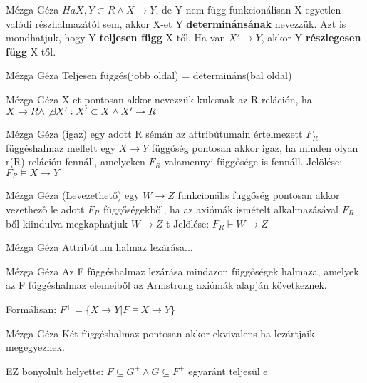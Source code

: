 \begin{definicio}{Mézga Géza}
$Ha X,Y \subset R \land X\rightarrow Y$, de Y nem függ funkcionálisan X egyetlen valódi részhalmazától sem, akkor X-et Y \textbf{determinánsának} nevezzük. Azt is mondhatjuk, hogy Y \textbf{teljesen függ} X-től. Ha van $X'\rightarrow Y$, akkor Y \textbf{részlegesen függ} X-től.
\end{definicio}

\begin{definicio}{Mézga Géza}
Teljesen függés(jobb oldal) = determináns(bal oldal)
\end{definicio}

\begin{definicio}{Mézga Géza}
X-et pontosan akkor nevezzük kulcsnak az R reláción, ha $X \rightarrow R \land \not\exists X' : X' \subset X \land X' \rightarrow R$
\end{definicio}

\begin{definicio}{Mézga Géza}
(igaz) egy adott R sémán az attribútumain értelmezett $F_R$ függéshalmaz mellett egy $X \rightarrow Y$ függőség pontosan akkor igaz, ha minden olyan r(R) reláción fennáll, amelyeken $F_R$ valamennyi függősége is fennáll. Jelölése: $F_R\models X \rightarrow Y$
\end{definicio}

\begin{definicio}{Mézga Géza}
(Levezethető) egy $W \rightarrow Z$ funkcionális függőség pontosan akkor vezethező le adott $F_R$ függőségekből, ha az axiómák ismételt alkalmazásával $F_R$ ből kiindulva megkaphatjuk $W \rightarrow Z$-t Jelölése: $F_R\vdash W\rightarrow Z$
\end{definicio}

\begin{definicio}{Mézga Géza}
Attribútum halmaz lezárása...
\end{definicio}

\begin{definicio}{Mézga Géza}
Az F függéshalmaz lezárása mindazon függőségek halmaza, amelyek az F függéshalmaz elemeiből az Armstrong axiómák alapján következnek.

Formálisan: $F^+ = \lbrace X\rightarrow Y | F \models X \rightarrow Y\rbrace$
\end{definicio}

\begin{definicio}{Mézga Géza}
Két függéshalmaz pontosan akkor ekvivalens ha lezártjaik megegyeznek.

EZ bonyolult helyette: $F \subseteq G^+ \land G \subseteq F^+$ egyaránt teljesül e
\end{definicio}

